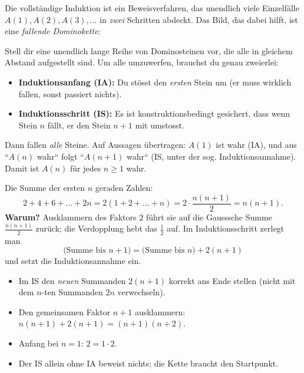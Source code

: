 


Die vollständige Induktion ist ein Beweisverfahren, das unendlich viele
Einzelfälle $A(1),A(2),A(3),\dots$ in \emph{zwei} Schritten abdeckt. Das
Bild, das dabei hilft, ist eine \emph{fallende Dominokette}:

\begin{werkzeugkasten}
Stell dir eine unendlich lange Reihe von Dominosteinen vor, die alle in
gleichem Abstand aufgestellt sind. Um alle umzuwerfen, brauchst du genau
zweierlei:
\begin{itemize}
  \item \textbf{Induktionsanfang (IA):} Du stösst den \emph{ersten} Stein
        um (er muss wirklich fallen, sonst passiert nichts).
  \item \textbf{Induktionsschritt (IS):} Es ist konstruktionsbedingt
        gesichert, dass wenn Stein $n$ fällt, er den Stein $n+1$ mit
        umstosst.
\end{itemize}
Dann fallen \emph{alle} Steine. Auf Aussagen übertragen: $A(1)$ ist wahr
(IA), und aus ``$A(n)$ wahr`` folgt ``$A(n+1)$ wahr`` (IS, unter der
sog. Induktionsannahme). Damit ist $A(n)$ für jedes $n\ge1$ wahr.
\end{werkzeugkasten}

\begin{werkzeugkasten}
Die Summe der ersten $n$ geraden Zahlen:
\begin{equation}
  2+4+6+\dots+2n = 2(1+2+\dots+n)=2\cdot\frac{n(n+1)}2=n(n+1).
\end{equation}
\textbf{Warum?} Ausklammern des Faktors $2$ führt sie auf die
Gausssche Summe $\frac{n(n+1)}2$ zurück; die Verdopplung hebt das
$\tfrac12$ auf. Im Induktionsschritt zerlegt man
\begin{equation}
  \text{(Summe bis } n+1)=\text{(Summe bis } n)+ 2(n+1)
\end{equation}
und setzt die Induktionsannahme ein.
\end{werkzeugkasten}

\begin{achtung}
\begin{itemize}
  \item Im IS den \emph{neuen} Summanden $2(n+1)$ korrekt ans Ende
        stellen (nicht mit dem $n$-ten Summanden $2n$ verwechseln).
  \item Den gemeinsamen Faktor $n+1$ ausklammern:
        $n(n+1)+2(n+1)=(n+1)(n+2)$.
  \item Anfang bei $n=1$: $2=1\cdot2$.
  \item Der IS allein ohne IA beweist nichts; die Kette braucht den
        Startpunkt.
\end{itemize}
\end{achtung}
